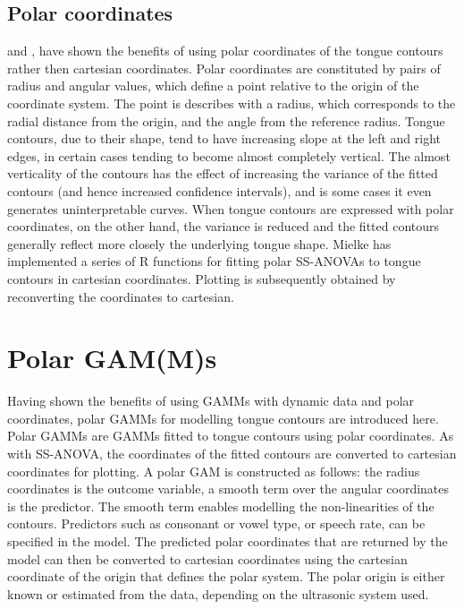 \documentclass[12pt,]{article}
\begin{document}
\hypertarget{polar-coordinates}{%
\subsection{Polar coordinates}\label{polar-coordinates}}

\citet{mielke2015} and \citet{heyne2015a}, \citet{heyne2015} have shown
the benefits of using polar coordinates of the tongue contours rather
then cartesian coordinates. Polar coordinates are constituted by pairs
of radius and angular values, which define a point relative to the
origin of the coordinate system. The point is describes with a radius,
which corresponds to the radial distance from the origin, and the angle
from the reference radius. Tongue contours, due to their shape, tend to
have increasing slope at the left and right edges, in certain cases
tending to become almost completely vertical. The almost verticality of
the contours has the effect of increasing the variance of the fitted
contours (and hence increased confidence intervals), and is some cases
it even generates uninterpretable curves. When tongue contours are
expressed with polar coordinates, on the other hand, the variance is
reduced and the fitted contours generally reflect more closely the
underlying tongue shape. Mielke has implemented a series of R
\citep{r-core-team2018} functions for fitting polar SS-ANOVAs to tongue
contours in cartesian coordinates. Plotting is subsequently obtained by
reconverting the coordinates to cartesian.

\hypertarget{polar-gamms}{%
\section{Polar GAM(M)s}\label{polar-gamms}}

Having shown the benefits of using GAMMs with dynamic data and polar
coordinates, polar GAMMs for modelling tongue contours are introduced
here. Polar GAMMs are GAMMs fitted to tongue contours using polar
coordinates. As with SS-ANOVA, the coordinates of the fitted contours
are converted to cartesian coordinates for plotting. A polar GAM is
constructed as follows: the radius coordinates is the outcome variable,
a smooth term over the angular coordinates is the predictor. The smooth
term enables modelling the non-linearities of the contours. Predictors
such as consonant or vowel type, or speech rate, can be specified in the
model. The predicted polar coordinates that are returned by the model
can then be converted to cartesian coordinates using the cartesian
coordinate of the origin that defines the polar system. The polar origin
is either known or estimated from the data, depending on the ultrasonic
system used.
\end{document}
